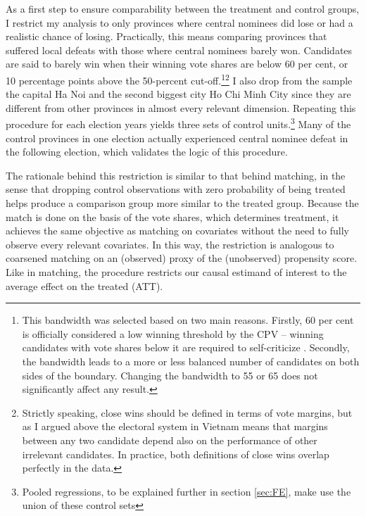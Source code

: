 \documentclass[12pt]{article}\usepackage[]{graphicx}\usepackage[]{color}
\newcommand{\1}{\mathbbm{1}}
\begin{document}
As a first step to ensure comparability between the treatment and control groups, I restrict my analysis to only provinces where central nominees did lose or had a realistic chance of losing.  Practically, this means comparing provinces that suffered local defeats with those where central nominees barely won. Candidates are said to barely win when their winning vote shares are below 60 per cent, or 10 percentage points above the 50-percent cut-off.\footnote{This bandwidth was selected based on two main reasons. Firstly, 60 per cent is officially considered a low winning threshold by the CPV – winning candidates with vote shares below it are required to self-criticize \citep{MaleskySchuler2011}. Secondly, the bandwidth leads to a more or less balanced number of candidates on both sides of the boundary. Changing the bandwidth to 55 or 65 does not significantly affect any result.}\footnote{Strictly speaking, close wins should be defined in terms of vote margins, but as I argued above the electoral system in Vietnam means that margins between any two candidate depend also on the performance of other irrelevant candidates. In practice, both definitions of close wins overlap perfectly in the data.} I also drop from the sample the capital Ha Noi and the second biggest city Ho Chi Minh City since they are different from other provinces in almost every relevant dimension. Repeating this procedure for each election years yields three sets of control units.\footnote{Pooled regressions, to be explained further in section \ref{sec:FE}, make use the union of these control sets} Many of the control provinces in one election actually experienced central nominee defeat in the following election, which validates the logic of this procedure.

The rationale behind this restriction is similar to that behind matching, in the sense that dropping control observations with zero probability of being treated helps produce a comparison group more similar to the treated group. Because the match is done on the basis of the vote shares, which determines treatment, it achieves the same objective as matching on covariates without the need to fully observe every relevant covariates. In this way, the restriction is analogous to coarsened matching on an (observed) proxy of the (unobserved) propensity score. Like in matching, the procedure restricts our causal estimand of interest to the average effect on the treated (ATT).
\end{document}
